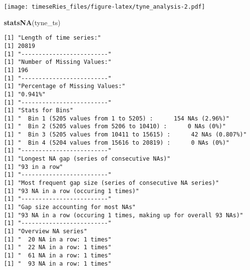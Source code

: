 \documentclass[]{book}
\newenvironment{Shaded}{\begin{snugshade}}{\end{snugshade}}
\newcommand{\KeywordTok}[1]{\textcolor[rgb]{0.13,0.29,0.53}{\textbf{#1}}}
\newcommand{\NormalTok}[1]{#1}
\begin{document}
\texttt{[image: timeseRies\_files/figure-latex/tyne\_analysis-2.pdf]}

\begin{Shaded}
\begin{Highlighting}[]
\KeywordTok{statsNA}\NormalTok{(tyne_ts)}
\end{Highlighting}
\end{Shaded}

\begin{verbatim}
[1] "Length of time series:"
[1] 20819
[1] "-------------------------"
[1] "Number of Missing Values:"
[1] 196
[1] "-------------------------"
[1] "Percentage of Missing Values:"
[1] "0.941%"
[1] "-------------------------"
[1] "Stats for Bins"
[1] "  Bin 1 (5205 values from 1 to 5205) :      154 NAs (2.96%)"
[1] "  Bin 2 (5205 values from 5206 to 10410) :      0 NAs (0%)"
[1] "  Bin 3 (5205 values from 10411 to 15615) :      42 NAs (0.807%)"
[1] "  Bin 4 (5204 values from 15616 to 20819) :      0 NAs (0%)"
[1] "-------------------------"
[1] "Longest NA gap (series of consecutive NAs)"
[1] "93 in a row"
[1] "-------------------------"
[1] "Most frequent gap size (series of consecutive NA series)"
[1] "93 NA in a row (occuring 1 times)"
[1] "-------------------------"
[1] "Gap size accounting for most NAs"
[1] "93 NA in a row (occuring 1 times, making up for overall 93 NAs)"
[1] "-------------------------"
[1] "Overview NA series"
[1] "  20 NA in a row: 1 times"
[1] "  22 NA in a row: 1 times"
[1] "  61 NA in a row: 1 times"
[1] "  93 NA in a row: 1 times"
\end{verbatim}
\end{document}
